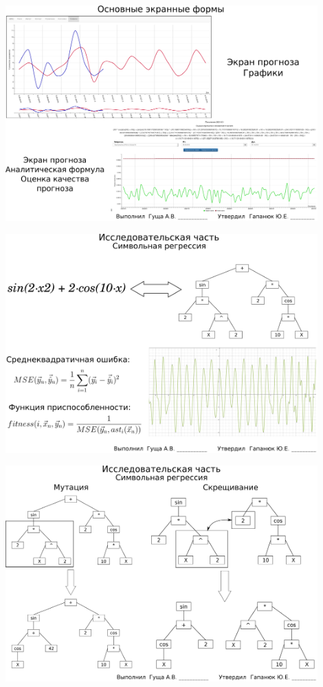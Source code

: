 \documentclass[russian,utf8, a1paper, emptystyle]{eskdgraph}
\begin{document}
\begin{ESKDdrawing}
\includegraphics[width=0.90\textwidth]{lists/list9_2}
\end{ESKDdrawing}

\begin{ESKDdrawing}
\includegraphics[width=0.90\textwidth]{lists/list10_1}
\end{ESKDdrawing}

\begin{ESKDdrawing}
\includegraphics[width=0.90\textwidth]{lists/list10_1_2}
\end{ESKDdrawing}
\end{document}
